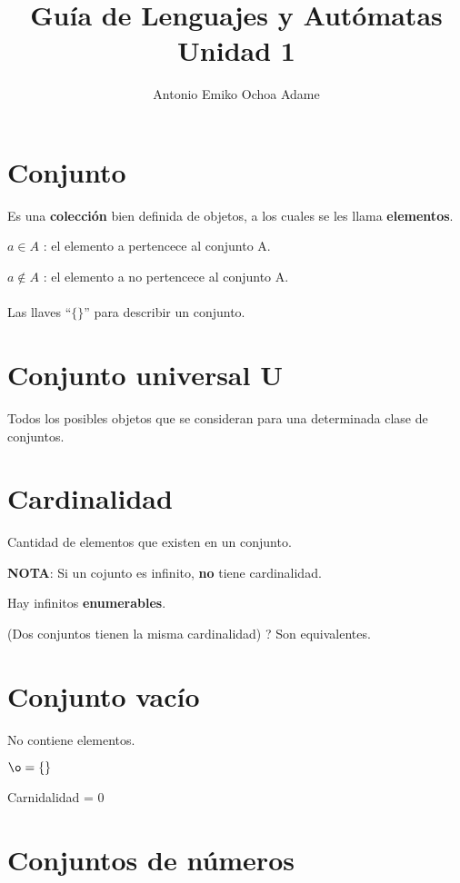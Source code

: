\documentclass{article}
\begin{document}
\title{Guía de Lenguajes y Autómatas Unidad 1}
\author{Antonio Emiko Ochoa Adame}
\maketitle

\section{Conjunto}

Es una \textbf{colección} bien definida de objetos, a los cuales
se les llama \textbf{elementos}.
\vspace{1em}

$a \in A $ : el elemento a pertencece al conjunto A.

$a \notin A $ : el elemento a no pertencece al conjunto A.

\paragraph{}
Las llaves ``$\{\}$'' para describir un conjunto.

\section{Conjunto universal U}

Todos los posibles objetos que se consideran para una determinada clase de
conjuntos.

\section{Cardinalidad}

Cantidad de elementos que existen en un conjunto.

\textbf{NOTA}: Si un cojunto es infinito,  \textbf{no} tiene cardinalidad.

Hay infinitos \textbf{enumerables}.

(Dos conjuntos tienen la misma cardinalidad) ? Son equivalentes.

\section{Conjunto vacío}

No contiene elementos.

$\o = \{\}$

Carnidalidad = 0

\section{Conjuntos de números}
\end{document}
